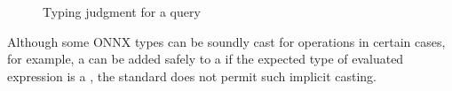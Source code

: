 \begin{figure}
    \begin{minipage}[t]{1\textwidth}
    \caption{Typing judgment for a \vnnlib{} query}
    \label{fig:query-typing}
    \end{minipage}
\end{figure}

Although some ONNX types can be soundly cast for operations in certain cases, for example, a  can be added safely to a  if the expected type of evaluated expression is a , the \vnnlib{} standard does not permit such implicit casting.

